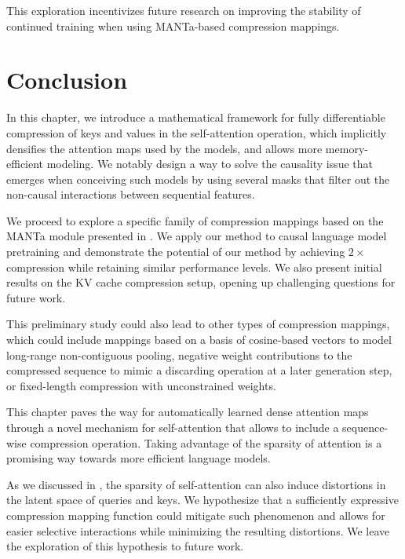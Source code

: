 This exploration incentivizes future research on improving the stability of continued training when using MANTa-based compression mappings.

\section*{Conclusion}

In this chapter, we introduce a mathematical framework for fully differentiable compression of keys and values in the self-attention operation, which implicitly densifies the attention maps used by the models, and allows more memory-efficient modeling. We notably design a way to solve the causality issue that emerges when conceiving such models by using several masks that filter out the non-causal interactions between sequential features.

We proceed to explore a specific family of compression mappings based on the MANTa module presented in . We apply our method to causal language model pretraining and demonstrate the potential of our method by achieving $2 \times$ compression while retaining similar performance levels. We also present initial results on the KV cache compression setup, opening up challenging questions for future work.

This preliminary study could also lead to other types of compression mappings, which could include mappings based on a basis of cosine-based vectors to model long-range non-contiguous pooling, negative weight contributions to the compressed sequence to mimic a discarding operation at a later generation step, or fixed-length compression with unconstrained weights.

\vspace{2em}

This chapter paves the way for automatically learned dense attention maps through a novel mechanism for self-attention that allows to include a sequence-wise compression operation. Taking advantage of the sparsity of attention is a promising way towards more efficient language models.

As we discussed in , the sparsity of self-attention can also induce distortions in the latent space of queries and keys. We hypothesize that a sufficiently expressive compression mapping function could mitigate such phenomenon and allows for easier selective interactions while minimizing the resulting distortions. We leave the exploration of this hypothesis to future work.


